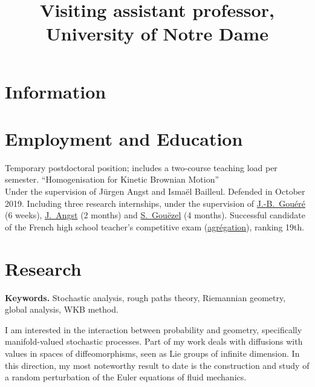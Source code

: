 \documentclass[11pt,classic]{moderncv}
\title{Visiting assistant professor, University of Notre Dame}
\begin{document}
\makecvtitle
{}

\vspace{-25pt}

\section{Information}

\section{Employment and Education}

        {Temporary postdoctoral position; includes a two-course teaching load per semester.}
        {``Homogenisation for Kinetic Brownian Motion''\\Under the supervision of Jürgen Angst and Ismaël Bailleul. Defended in October 2019.}
   {Including three research internships, under the supervision of \href{http://www.lmpt.univ-tours.fr/~gouere/}{J.-B.~Gouéré} (6 weeks), \href{https://perso.univ-rennes1.fr/jurgen.angst/}{J.~Angst} (2 months) and \href{http://www.math.sciences.univ-nantes.fr/~gouezel/}{S.~Gouëzel} (4 months). \newline
    Successful candidate of the French high school teacher's competitive exam (\href{https://en.wikipedia.org/wiki/Agr\%C3\%A9gation}{agrégation}), ranking 19th.}

\section{Research}

\textbf{Keywords.} Stochastic analysis, rough paths theory, Riemannian geometry, global analysis, WKB method.

\smallskip

I am interested in the interaction between probability and geometry, specifically manifold-valued stochastic processes. Part of my work deals with diffusions with values in spaces of diffeomorphisms, seen as Lie groups of infinite dimension. In this direction, my most noteworthy result to date is the construction and study of a random perturbation of the Euler equations of fluid mechanics.
\end{document}
